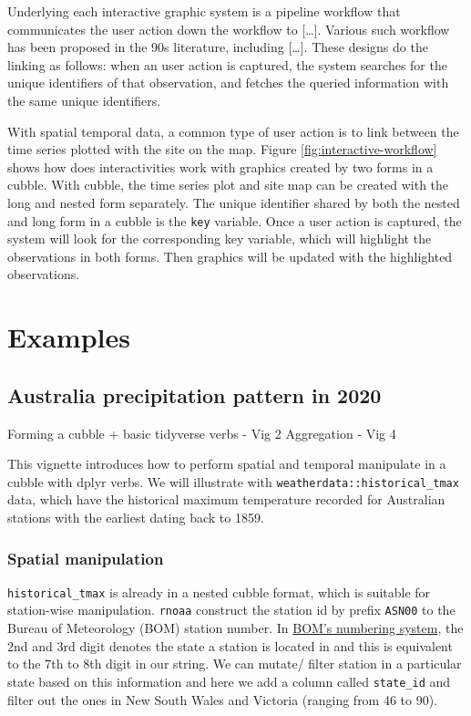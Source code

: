 \documentclass[
]{jss}
\begin{document}
Underlying each interactive graphic system is a pipeline workflow that
communicates the user action down the workflow to {[}\ldots{]}. Various
such workflow has been proposed in the 90s literature, including
{[}\ldots{]}. These designs do the linking as follows: when an user
action is captured, the system searches for the unique identifiers of
that observation, and fetches the queried information with the same
unique identifiers.

With spatial temporal data, a common type of user action is to link
between the time series plotted with the site on the map. Figure
\ref{fig:interactive-workflow} shows how does interactivities work with
graphics created by two forms in a cubble. With cubble, the time series
plot and site map can be created with the long and nested form
separately. The unique identifier shared by both the nested and long
form in a cubble is the \texttt{key} variable. Once a user action is
captured, the system will look for the corresponding key variable, which
will highlight the observations in both forms. Then graphics will be
updated with the highlighted observations.

\newpage

\hypertarget{examples}{%
\section{Examples}\label{examples}}

\hypertarget{australia-precipitation-pattern-in-2020}{%
\subsection{Australia precipitation pattern in
2020}\label{australia-precipitation-pattern-in-2020}}

Forming a cubble + basic tidyverse verbs - Vig 2 Aggregation - Vig 4

This vignette introduces how to perform spatial and temporal manipulate
in a cubble with dplyr verbs. We will illustrate with
\texttt{weatherdata::historical\_tmax} data, which have the historical
maximum temperature recorded for Australian stations with the earliest
dating back to 1859.

\hypertarget{spatial-manipulation}{%
\subsubsection{Spatial manipulation}\label{spatial-manipulation}}

\texttt{historical\_tmax} is already in a nested cubble format, which is
suitable for station-wise manipulation. \texttt{rnoaa} construct the
station id by prefix \texttt{ASN00} to the Bureau of Meteorology (BOM)
station number. In
\href{http://www.bom.gov.au/climate/cdo/about/site-num.shtml}{BOM's
numbering system}, the 2nd and 3rd digit denotes the state a station is
located in and this is equivalent to the 7th to 8th digit in our string.
We can mutate/ filter station in a particular state based on this
information and here we add a column called \texttt{state\_id} and
filter out the ones in New South Wales and Victoria (ranging from 46 to
90).
\end{document}
